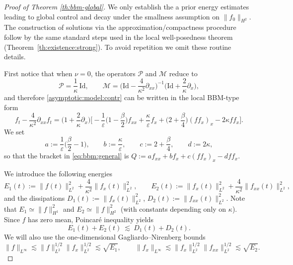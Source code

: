 \documentclass[reqno]{amsart}
\theoremstyle{definition}
\numberwithin{equation}{section}
\numberwithin{theorem}{section}
\numberwithin{definition}{section}
\begin{document}
\begin{proof}[Proof of Theorem \ref{th:bbm-global}]
	We only establish the a prior energy estimates leading to global control and decay under the smallness
	assumption on $\|f_0\|_{H^2}$. The construction of solutions via the approximation/compactness procedure follow by the same standard steps used in the local well-posedness theorem
	(Theorem~\ref{th:existence:strong}). To avoid repetition we omit these routine details. 
	\medskip
	
	First notice that when $\nu=0$, the operators $\mathcal{P}$ and $\mathcal{M}$ reduce to
	\[
	\mathcal{P}=\frac{1}{\kappa}\,\mathrm{Id},\qquad
	\mathcal{M}=\Big(\mathrm{Id}-\frac{4}{\kappa^2}\partial_{xx}\Big)^{-1}\Big(\mathrm{Id}+\frac{2}{\kappa}\partial_x\Big),
	\]
	and therefore \eqref{asymptotic:model:contr} can be written in the local BBM-type form
	\begin{equation}\label{eq:bbm:general}
		f_t-\frac{4}{\kappa^2}\partial_{xx}f_t
		=\Big(1+\frac{2}{\kappa}\partial_x\Big)\Big[
		-\frac{1}{\varepsilon}\Big(1-\frac{\beta}{2}\Big)f_{xx}
		+\frac{\kappa}{\varepsilon}f_x
		+\Big(2+\frac{\beta}{4}\Big)(ff_x)_x
		-2\kappa ff_x\Big].
	\end{equation}
	We set
	\[
	a:=\frac{1}{\varepsilon}\Big(\frac{\beta}{2}-1\Big),\qquad
	b:=\frac{\kappa}{\varepsilon},\qquad
	c:=2+\frac{\beta}{4},\qquad
	d:=2\kappa,
	\]
	so that the bracket in \eqref{eq:bbm:general} is $Q:=a f_{xx}+b f_x+c(ff_x)_x-dff_x$. \medskip
	
	We introduce the following energies
	\[
	E_1(t):=\|f(t)\|_{L^2}^2+\frac{4}{\kappa^2}\|f_x(t)\|_{L^2}^2,
	\qquad
	E_2(t):=\|f_x(t)\|_{L^2}^2+\frac{4}{\kappa^2}\|f_{xx}(t)\|_{L^2}^2,
	\]
	and the dissipations $D_1(t):=\|f_x(t)\|_{L^2}^2$, $D_2(t):=\|f_{xx}(t)\|_{L^2}^2$. Note that $E_1\simeq\|f\|_{H^1}^2$ and
	$E_2\simeq\|f\|_{H^2}^2$ (with constants depending only on $\kappa$). Since $f$ has zero mean, Poincar\'e inequality yields
	\begin{equation}\label{eq:coercive-bbm}
		E_1(t)+E_2(t)\ \lesssim\ D_1(t)+D_2(t).
	\end{equation}
	We will also use the one-dimensional Gagliardo--Nirenberg bounds
	\begin{equation}\label{eq:GN-BBM}
		\|f\|_{L^\infty}\lesssim \|f\|_{L^2}^{1/2}\|f_x\|_{L^2}^{1/2}\lesssim \sqrt{E_1},
		\qquad
		\|f_x\|_{L^\infty}\lesssim \|f_x\|_{L^2}^{1/2}\|f_{xx}\|_{L^2}^{1/2}\lesssim \sqrt{E_2}.
	\end{equation}
	

\end{proof}
\end{document}
